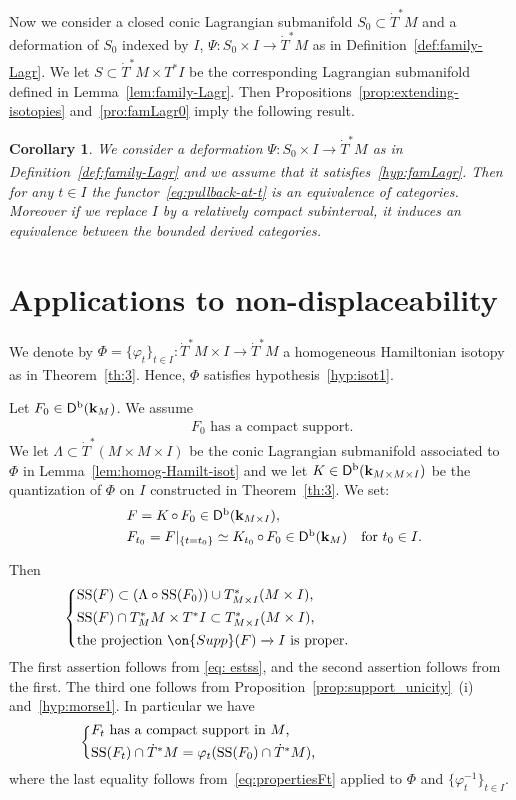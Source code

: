 \documentclass[12pt,leqno]{article}
\newtheorem{corollary}[theorem]{Corollary}
\theoremstyle{definition}
\def\phi{{\varphi}}
\newcommand{\cor}{{\bf k}}
\renewcommand{\to}[1][]{\xrightarrow[]{#1}}
\newcommand{\conv}[1][]{\mathop{\circ}\limits_{#1}}
\newcommand{\opb}[1]{#1^{-1}}
\newcommand{\cl}{\colon}
\newcommand{\ba}{\begin{array}}
\newcommand{\ea}{\end{array}}
\newcommand{\eq}{\begin{eqnarray}}
\newcommand{\eneq}{\end{eqnarray}}
\newcommand{\Supp}{\on{Supp}}
\newcommand{\Der}[1][]{\mathsf{D}^{#1}}
\newcommand{\Derb}{\Der[\mathrm{b}]}
\newcommand{\SSi}{\mathrm{SS}}
\newcommand{\dT}{{\dot{T}}}
\newcommand{\dTM}{{\dT}^*M}
\numberwithin{equation}{section}
\begin{document}
Now we consider a closed conic Lagrangian submanifold $S_0 \subset \dTM$
and a deformation of $S_0$ indexed by $I$, $\Psi\cl S_0\times I \to \dTM$ as
in Definition~\ref{def:family-Lagr}.  We let $S\subset \dTM\times T^*I$ be the
corresponding Lagrangian submanifold defined in Lemma~\ref{lem:family-Lagr}.
Then Propositions~\ref{prop:extending-isotopies} and~\ref{pro:famLagr0}
imply the following result.
\begin{corollary}\label{thm:famLagr}
We consider a deformation $\Psi\cl S_0\times I \to \dTM$ as in 
Definition~\ref{def:family-Lagr} and we
assume that it satisfies~\eqref{hyp:famLagr}.
Then for any $t\in I$ the functor~\eqref{eq:pullback-at-t} is an equivalence
of categories. 
Moreover if we replace $I$ by a relatively compact subinterval,
it induces an equivalence between the bounded derived categories.
\end{corollary}



\section{Applications to non-displaceability}
\label{sec:applications}
We denote by $\Phi=\{\phi_t\}_{t\in I}\cl \dTM\times I\to \dTM$ 
a homogeneous Hamiltonian isotopy as in Theorem~\ref{th:3}.
Hence, $\Phi$ satisfies hypothesis~\eqref{hyp:isot1}. 


Let $F_0\in\Derb(\cor_M)$. We assume
\eq\label{hyp:morse1}
&&\text{$F_0$ has a compact support.}
\eneq
We let $\Lambda \subset \dT^*(M\times M\times I)$ be the conic Lagrangian
submanifold associated to $\Phi$ in Lemma~\ref{lem:homog-Hamilt-isot} and
we let $K\in\Derb(\cor_{M\times M\times I})$ be the quantization of
$\Phi$ on $I$ constructed in Theorem~\ref{th:3}. We set:
\eq\label{eq:phiKF}\ba{rcl}
&&F=K\conv F_0\in\Derb(\cor_{M\times I}),\\
&&F_{t_0}=F\vert_{\{t=t_0\}} \simeq K_{t_0} \conv F_0  \in\Derb(\cor_{M})
\quad\text{for $t_0\in I$.}
\ea\eneq
Then 
\eq\label{eq:propertiesFt}
&&\left\{
\parbox{65ex}{
$\SSi(F) \subset (\Lambda\circ \SSi(F_0)) \cup T^*_{M\times I}(M\times I)$,
 \\[1ex]
$\SSi(F)\cap T^*_MM\times T^*I\subset T^*_{M\times I}(M\times I)$,
\\[1ex]
 the projection $\Supp (F) \to I$ is proper.
}\right.
\eneq
The first assertion follows from \eqref{eq: estss},
and the second assertion follows from the first.
The third one follows from
Proposition~\ref{prop:support_unicity}~(i) and~\eqref{hyp:morse1}.
In particular we have
\eq\label{eq:propertiesFt2}
&&\left\{
\parbox{60ex}{
$F_t$ has a compact support in $M$,\\[1ex]
$\SSi(F_t)\cap\dTM=\phi_t(\SSi(F_0)\cap\dTM)$,
}\right.
\eneq
where the last equality follows from~\eqref{eq:propertiesFt} applied
to $\Phi$ and $\{\opb{\phi_t}\}_{t\in I}$.
\end{document}
